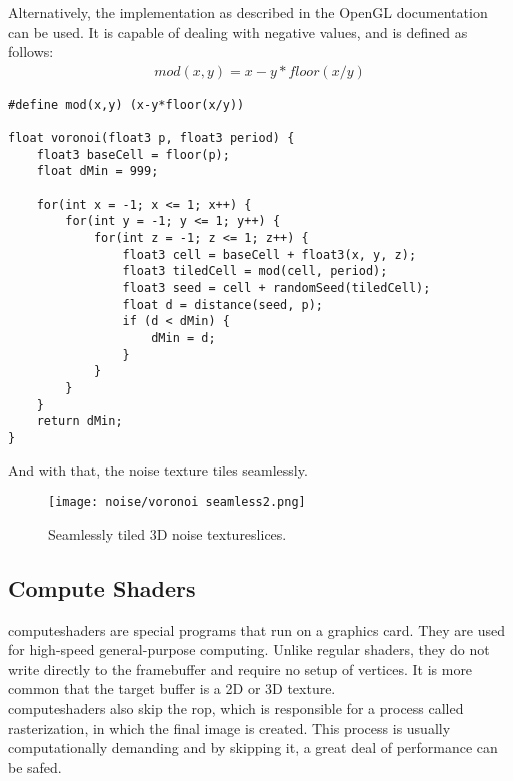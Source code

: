 \noindent
Alternatively, the implementation as described in the OpenGL documentation \cite{opengl:mod} can be used.
It is capable of dealing with negative values, and is defined as follows:
$$
\begin{array}{l}
    mod(x, y) = x - y * floor(x/y)
\end{array}
$$

\begin{lstlisting}[language=HLSL, caption=Implementation of seamless 3D Voronoi \gls{noise} algorithm., label=lst:shader:noise:voronoi:seamless2]
#define mod(x,y) (x-y*floor(x/y))

float voronoi(float3 p, float3 period) {
    float3 baseCell = floor(p);
    float dMin = 999;

    for(int x = -1; x <= 1; x++) {
        for(int y = -1; y <= 1; y++) {
            for(int z = -1; z <= 1; z++) {
                float3 cell = baseCell + float3(x, y, z);
                float3 tiledCell = mod(cell, period);
                float3 seed = cell + randomSeed(tiledCell);
                float d = distance(seed, p);
                if (d < dMin) {
                    dMin = d;
                }
            }
        }
    }
    return dMin;
}
\end{lstlisting}

\noindent
And with that, the \gls{noise} texture tiles seamlessly.

\begin{figure}[H]
    \texttt{[image: noise/voronoi seamless2.png]}
    \caption{Seamlessly tiled 3D \gls{noise} \gls{textureslice}s.}
    \label{img:rnd:noise:seamless2}
\end{figure}

\subsection{Compute Shaders}
\label{section:noise:compute}
\Gls{computeshader}s are special programs that run on a graphics card. They are used for high-speed general-purpose computing.
Unlike regular \gls{shader}s, they do not write directly to the \gls{framebuffer} and require no setup of vertices.
It is more common that the target buffer is a 2D or 3D texture.
\\
\Gls{computeshader}s also skip the \gls{rop}, which is responsible for a process called \gls{rasterization}, in which the final image is created.
This process is usually computationally demanding and by skipping it, a great deal of performance can be safed.

